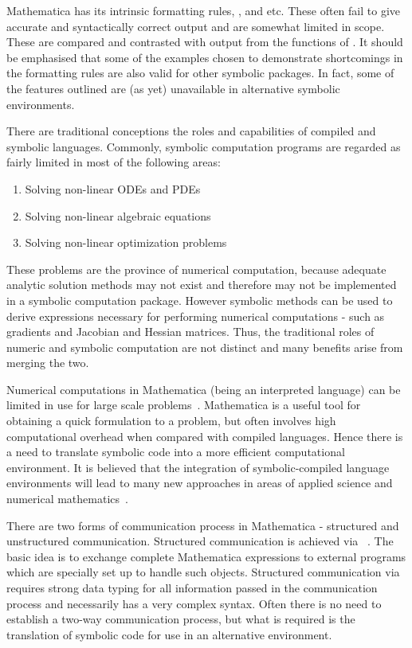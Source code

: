 \documentclass [12pt,twoside]{article}
\begin{document}
Mathematica has its intrinsic formatting rules, , 
and  etc. These often fail to give accurate and syntactically correct
output and are somewhat limited in scope. These are compared and contrasted with
output from the  functions of . It should be
emphasised that some of the examples chosen to demonstrate shortcomings
in the formatting rules are also valid for other symbolic packages. In
fact, some of the features outlined are (as yet) unavailable in
alternative symbolic environments.

There are traditional conceptions the roles and capabilities of compiled and
symbolic languages. Commonly, symbolic computation programs are regarded as fairly
limited in most of the following areas:
\begin{enumerate}
\item Solving non-linear ODEs and PDEs
\item Solving non-linear algebraic equations
\item Solving non-linear optimization problems
\end{enumerate}
These problems are the province of numerical computation, because
adequate analytic solution methods may not exist and therefore may not be
implemented in a symbolic computation package. However symbolic methods can be
used to derive expressions necessary for performing numerical computations - such
as gradients and Jacobian and Hessian matrices. Thus, the traditional roles of
numeric and symbolic computation are not distinct and many benefits
arise from merging the two.

Numerical computations in Mathematica (being an interpreted language)
can be limited in use for large scale problems~\cite{me93d}.
Mathematica is a useful tool for obtaining a quick formulation to a
problem, but often involves high computational overhead when compared
with compiled languages. Hence there is a need to translate symbolic code
into a more efficient computational environment. It is believed that the
integration of symbolic-compiled language environments will lead to many
new approaches in areas of applied science and numerical
mathematics~\cite{dewarphd,wirth-80}.

There are two forms of communication process in Mathematica - structured and
unstructured communication. Structured communication is achieved via
~\cite{mathlink}. The basic idea is to exchange
complete Mathematica expressions to external programs which are
specially set up to handle such objects. Structured communication via
 requires strong data typing for all information passed in
the communication process and necessarily has a very complex syntax.
Often there is no need to establish a two-way communication process, but
what is required is the translation of symbolic code for use in an
alternative environment.
\end{document}
